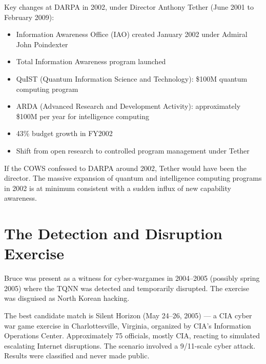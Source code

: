 
Key changes at DARPA in 2002, under Director Anthony Tether (June 2001 to February 2009):

\begin{itemize}
\item Information Awareness Office (IAO) created January 2002 under Admiral John Poindexter
\item Total Information Awareness program launched
\item QuIST (Quantum Information Science and Technology): \$100M quantum computing program
\item ARDA (Advanced Research and Development Activity): approximately \$100M per year for intelligence computing
\item 43\% budget growth in FY2002
\item Shift from open research to controlled program management under Tether
\end{itemize}

If the COWS confessed to DARPA around 2002, Tether would have been the director. The massive expansion of quantum and intelligence computing programs in 2002 is at minimum consistent with a sudden influx of new capability awareness.

\section*{The Detection and Disruption Exercise}
\label{record:int-the-detection-and-disruption-exercise}


Bruce was present as a witness for cyber-wargames in 2004--2005 (possibly spring 2005) where the TQNN was detected and temporarily disrupted. The exercise was disguised as North Korean hacking.

The best candidate match is Silent Horizon (May 24--26, 2005) --- a CIA cyber war game exercise in Charlottesville, Virginia, organized by CIA's Information Operations Center. Approximately 75 officials, mostly CIA, reacting to simulated escalating Internet disruptions. The scenario involved a 9/11-scale cyber attack. Results were classified and never made public.

